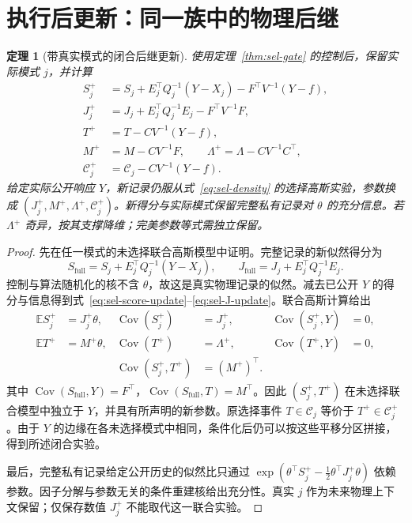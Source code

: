 \documentclass[UTF8,fontset=fandol,11pt,a4paper]{ctexart}
\newcommand{\E}{\mathbb E}
\newcommand{\Cov}{\operatorname{Cov}}
\newtheorem{theorem}{定理}[section]
\theoremstyle{definition}
\theoremstyle{remark}
\numberwithin{equation}{section}
\begin{document}
\section{执行后更新：同一族中的物理后继}
\label{sec:sel-update}

\begin{theorem}[带真实模式的闭合后继更新]
\label{thm:sel-closure}
使用定理~\ref{thm:sel-gate} 的控制后，保留实际模式 $j$，并计算
\begin{align}
 S_j^+&=S_j+E_j^\top Q_j^{-1}(Y-X_j)-F^\top V^{-1}(Y-f),\label{eq:sel-score-update}\\
 J_j^+&=J_j+E_j^\top Q_j^{-1}E_j-F^\top V^{-1}F,\label{eq:sel-J-update}\\
 T^+&=T-CV^{-1}(Y-f),\label{eq:sel-T-update}\\
 M^+&=M-CV^{-1}F,\qquad
 \Lambda^+=\Lambda-CV^{-1}C^\top,\label{eq:sel-gate-update}\\
 \mathcal C_j^+&=\mathcal C_j-CV^{-1}(Y-f).\label{eq:sel-cell-update}
\end{align}
给定实际公开响应 $Y$，新记录仍服从式~\eqref{eq:sel-density} 的选择高斯实验，参数换成 $(J_j^+,M^+,\Lambda^+,\mathcal C_j^+)$。新得分与实际模式保留完整私有记录对 $\theta$ 的充分信息。若 $\Lambda^+$ 奇异，按其支撑降维；完美参数等式需独立保留。
\end{theorem}

\begin{proof}
先在任一模式的未选择联合高斯模型中证明。完整记录的新似然得分为
\[
 S_{\mathrm{full}}=S_j+E_j^\top Q_j^{-1}(Y-X_j),\qquad
 J_{\mathrm{full}}=J_j+E_j^\top Q_j^{-1}E_j.
\]
控制与算法随机化的核不含 $\theta$，故这是真实物理记录的似然。减去已公开 $Y$ 的得分与信息得到式~\eqref{eq:sel-score-update}--\eqref{eq:sel-J-update}。联合高斯计算给出
\begin{align*}
 \E S_j^+&=J_j^+\theta,&\Cov(S_j^+)&=J_j^+,&\Cov(S_j^+,Y)&=0,\\
 \E T^+&=M^+\theta,&\Cov(T^+)&=\Lambda^+,&\Cov(T^+,Y)&=0,\\
 &&\Cov(S_j^+,T^+)&=(M^+)^\top.
\end{align*}
其中 $\Cov(S_{\mathrm{full}},Y)=F^\top$，$\Cov(S_{\mathrm{full}},T)=M^\top$。因此 $(S_j^+,T^+)$ 在未选择联合模型中独立于 $Y$，并具有所声明的新参数。原选择事件 $T\in\mathcal C_j$ 等价于 $T^+\in\mathcal C_j^+$。由于 $Y$ 的边缘在各未选择模式中相同，条件化后仍可以按这些平移分区拼接，得到所述闭合实验。

最后，完整私有记录给定公开历史的似然比只通过
$\exp(\theta^\top S_j^+-\tfrac12\theta^\top J_j^+\theta)$
依赖参数。因子分解与参数无关的条件重建核给出充分性。真实 $j$ 作为未来物理上下文保留；仅保存数值 $J_j^+$ 不能取代这一联合实验。
\end{proof}
\end{document}
